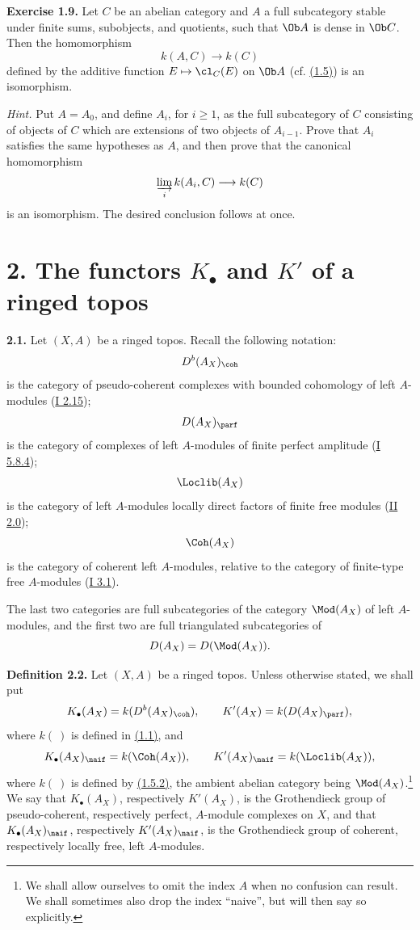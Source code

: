 \textbf{Exercise 1.9.} Let \(C\) be an abelian category and \(A\) a full subcategory stable under finite sums, subobjects, and quotients, such that \(\Ob A\) is dense in \(\Ob C\). Then the homomorphism
\[
 k(A,C)\longrightarrow k(C)
\]
defined by the additive function \(E\mapsto\cl_C(E)\) on \(\Ob A\) (cf. \hyperlink{sga6.e04.para.1-5}{(1.5)}) is an isomorphism.

\emph{Hint.} Put \(A=A_0\), and define \(A_i\), for \(i\geq1\), as the full subcategory of \(C\) consisting of objects of \(C\) which are extensions of two objects of \(A_{i-1}\). Prove that \(A_i\) satisfies the same hypotheses as \(A\), and then prove that the canonical homomorphism
\[
 \varinjlim_i k(A_i,C)\longrightarrow k(C)
\]
is an isomorphism. The desired conclusion follows at once.

\section*{2. The functors \(K_{\bullet}\) and \(K'\) of a ringed topos}

\textbf{2.1.} Let \((X,A)\) be a ringed topos. Recall the following notation:
\[
 D^b(A_X)_{\coh}
\]
is the category of pseudo-coherent complexes with bounded cohomology of left \(A\)-modules (\hyperlink{sga6.e01.ex.2-15}{I 2.15});
\[
 D(A_X)_{\parf}
\]
is the category of complexes of left \(A\)-modules of finite perfect amplitude (\hyperlink{sga6.e01.rem.5-8-4}{I 5.8.4});
\[
 \Loclib(A_X)
\]
is the category of left \(A\)-modules locally direct factors of finite free modules (\hyperlink{sga6.e02.para.2-0}{II 2.0});
\[
 \Coh(A_X)
\]
is the category of coherent left \(A\)-modules, relative to the category of finite-type free \(A\)-modules (\hyperlink{sga6.e01.def.3-1}{I 3.1}).

The last two categories are full subcategories of the category \(\Mod(A_X)\) of left \(A\)-modules, and the first two are full triangulated subcategories of
\[
 D(A_X)=D(\Mod(A_X)).
\]

\textbf{Definition 2.2.} Let \((X,A)\) be a ringed topos. Unless otherwise stated, we shall put
\[
 K_{\bullet}(A_X)=k(D^b(A_X)_{\coh}),\qquad
 K'(A_X)=k(D(A_X)_{\parf}),
\]
where \(k(\ )\) is defined in \hyperlink{sga6.e04.para.1-1}{(1.1)}, and
\[
 K_{\bullet}(A_X)_{\naif}=k(\Coh(A_X)),\qquad
 K'(A_X)_{\naif}=k(\Loclib(A_X)),
\]
where \(k(\ )\) is defined by \hyperlink{sga6.e04.eq.1-5-2}{(1.5.2)}, the ambient abelian category being \(\Mod(A_X)\).\footnote{We shall allow ourselves to omit the index \(A\) when no confusion can result. We shall sometimes also drop the index ``naive'', but will then say so explicitly.} We say that \(K_{\bullet}(A_X)\), respectively \(K'(A_X)\), is the Grothendieck group of pseudo-coherent, respectively perfect, \(A\)-module complexes on \(X\), and that \(K_{\bullet}(A_X)_{\naif}\), respectively \(K'(A_X)_{\naif}\), is the Grothendieck group of coherent, respectively locally free, left \(A\)-modules.

